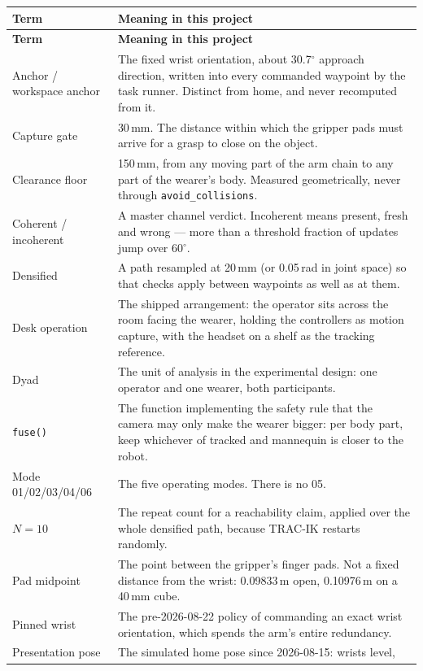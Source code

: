 \documentclass[11pt,a4paper,oneside]{report}
\newcommand{\code}[1]{\texttt{\small #1}}
\newcommand{\dg}{$^{\circ}$}
\begin{document}
\begin{longtable}{@{}p{}p{}@{}}
\toprule
\textbf{Term} & \textbf{Meaning in this project} \\
\midrule
\endfirsthead
\toprule
\textbf{Term} & \textbf{Meaning in this project} \\
\midrule
\endhead
Anchor / workspace anchor & The fixed wrist orientation, about 30.7\dg{}
approach direction, written into every commanded waypoint by the task runner.
Distinct from home, and never recomputed from it. \\
Capture gate & 30\,mm. The distance within which the gripper pads must arrive
for a grasp to close on the object. \\
Clearance floor & 150\,mm, from any moving part of the arm chain to any part of
the wearer's body. Measured geometrically, never through
\code{avoid\_collisions}. \\
Coherent / incoherent & A master channel verdict. Incoherent means present,
fresh and wrong --- more than a threshold fraction of updates jump over 60\dg. \\
Densified & A path resampled at 20\,mm (or 0.05\,rad in joint space) so that
checks apply between waypoints as well as at them. \\
Desk operation & The shipped arrangement: the operator sits across the room
facing the wearer, holding the controllers as motion capture, with the headset
on a shelf as the tracking reference. \\
Dyad & The unit of analysis in the experimental design: one operator and one
wearer, both participants. \\
\code{fuse()} & The function implementing the safety rule that the camera may
only make the wearer bigger: per body part, keep whichever of tracked and
mannequin is closer to the robot. \\
Mode 01/02/03/04/06 & The five operating modes. There is no 05. \\
$N=10$ & The repeat count for a reachability claim, applied over the whole
densified path, because TRAC-IK restarts randomly. \\
Pad midpoint & The point between the gripper's finger pads. Not a fixed
distance from the wrist: 0.09833\,m open, 0.10976\,m on a 40\,mm cube. \\
Pinned wrist & The pre-2026-08-22 policy of commanding an exact wrist
orientation, which spends the arm's entire redundancy. \\
Presentation pose & The simulated home pose since 2026-08-15: wrists level,

\end{longtable}
\end{document}
